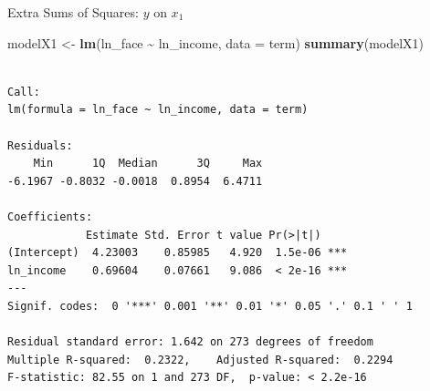 \documentclass[
  ignorenonframetext,
]{beamer}
\newenvironment{Shaded}{\begin{snugshade}}{\end{snugshade}}
\newcommand{\AttributeTok}[1]{\textcolor[rgb]{0.13,0.29,0.53}{#1}}
\newcommand{\FunctionTok}[1]{\textcolor[rgb]{0.13,0.29,0.53}{\textbf{#1}}}
\newcommand{\NormalTok}[1]{#1}
\newcommand{\OtherTok}[1]{\textcolor[rgb]{0.56,0.35,0.01}{#1}}
\newcommand{\SpecialCharTok}[1]{\textcolor[rgb]{0.81,0.36,0.00}{\textbf{#1}}}
\begin{document}
\begin{frame}[fragile]{Extra Sums of Squares: \(y\) on \(x_1\)}
\label{extra-sums-of-squares-y-on-x_1}
\footnotesize

\begin{Shaded}
\begin{Highlighting}[]
\NormalTok{modelX1 }\OtherTok{\textless{}{-}} \FunctionTok{lm}\NormalTok{(ln\_face }\SpecialCharTok{\textasciitilde{}}\NormalTok{ ln\_income, }\AttributeTok{data =}\NormalTok{ term)}
\FunctionTok{summary}\NormalTok{(modelX1)}
\end{Highlighting}
\end{Shaded}

\begin{verbatim}

Call:
lm(formula = ln_face ~ ln_income, data = term)

Residuals:
    Min      1Q  Median      3Q     Max 
-6.1967 -0.8032 -0.0018  0.8954  6.4711 

Coefficients:
            Estimate Std. Error t value Pr(>|t|)    
(Intercept)  4.23003    0.85985   4.920  1.5e-06 ***
ln_income    0.69604    0.07661   9.086  < 2e-16 ***
---
Signif. codes:  0 '***' 0.001 '**' 0.01 '*' 0.05 '.' 0.1 ' ' 1

Residual standard error: 1.642 on 273 degrees of freedom
Multiple R-squared:  0.2322,    Adjusted R-squared:  0.2294 
F-statistic: 82.55 on 1 and 273 DF,  p-value: < 2.2e-16
\end{verbatim}

\normalsize
\end{frame}
\end{document}
